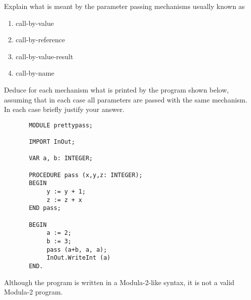 \begin{questions}
\begin{subquestions}
        Explain what is meant by the parameter passing mechanisms usually
        known as
                \begin{enumerate}
                \item call-by-value
                \item call-by-reference
                \item call-by-value-result
                \item call-by-name
                \end{enumerate}
        Deduce for each mechanism what is printed by the 
        program shown below, assuming that in each
	case all parameters are passed with the same mechanism.
        In each case briefly justify your answer.
\begin{verbatim}
       MODULE prettypass; 
       
       IMPORT InOut;

       VAR a, b: INTEGER;
 
       PROCEDURE pass (x,y,z: INTEGER);
       BEGIN
            y := y + 1;
            z := z + x
       END pass;
               
       BEGIN
            a := 2;
            b := 3;
            pass (a+b, a, a);
            InOut.WriteInt (a)
       END.
\end{verbatim}                   
Although the program is written in a Modula-2-like syntax, it
is not a valid Modula-2 program.

\end{subquestions}
\end{questions}



